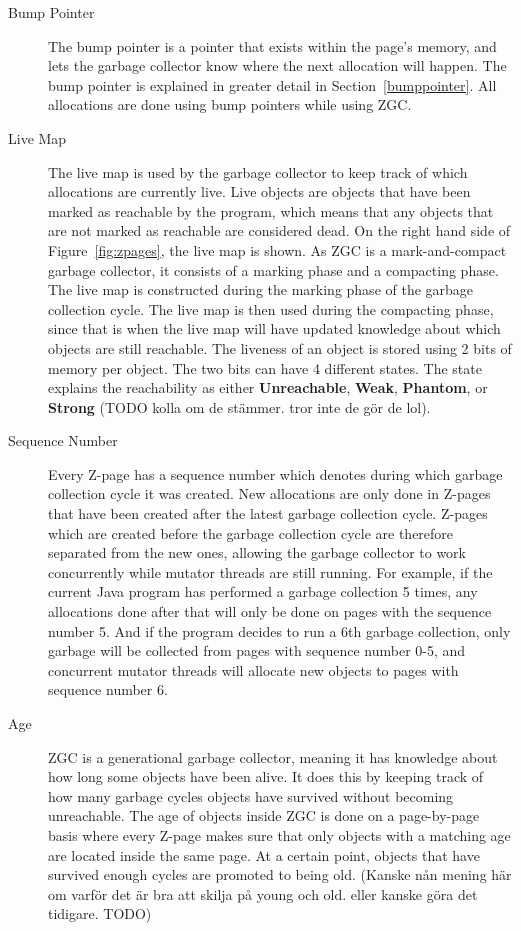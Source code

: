 \begin{description}
    \item[Bump Pointer]
        The bump pointer is a pointer that exists within the page's memory, and lets the garbage collector know where the next allocation will happen. The bump pointer is explained in greater detail in Section~\ref{bumppointer}. All allocations are done using bump pointers while using ZGC.
    \item[Live Map]
        The live map is used by the garbage collector to keep track of which allocations are currently live. Live objects are objects that have been marked as reachable by the program, which means that any objects that are not marked as reachable are considered dead. On the right hand side of Figure~\ref*{fig:zpages}, the live map is shown. As ZGC is a mark-and-compact garbage collector, it consists of a marking phase and a compacting phase. The live map is constructed during the marking phase of the garbage collection cycle. The live map is then used during the compacting phase, since that is when the live map will have updated knowledge about which objects are still reachable. The liveness of an object is stored using 2 bits of memory per object. The two bits can have 4 different states. The state explains the reachability as either \textbf{Unreachable}, \textbf{Weak}, \textbf{Phantom}, or \textbf{Strong} (TODO kolla om de stämmer. tror inte de gör de lol).
    \item[Sequence Number]
        Every Z-page has a sequence number which denotes during which garbage collection cycle it was created. New allocations are only done in Z-pages that have been created after the latest garbage collection cycle. Z-pages which are created before the garbage collection cycle are therefore separated from the new ones, allowing the garbage collector to work concurrently while mutator threads are still running. For example, if the current Java program has performed a garbage collection 5 times, any allocations done after that will only be done on pages with the sequence number 5. And if the program decides to run a 6th garbage collection, only garbage will be collected from pages with sequence number 0-5, and concurrent mutator threads will allocate new objects to pages with sequence number 6.
    \item[Age]
        ZGC is a generational garbage collector, meaning it has knowledge about how long some objects have been alive. It does this by keeping track of how many garbage cycles objects have survived without becoming unreachable. The age of objects inside ZGC is done on a page-by-page basis where every Z-page makes sure that only objects with a matching age are located inside the same page. At a certain point, objects that have survived enough cycles are promoted to being old. (Kanske nån mening här om varför det är bra att skilja på young och old. eller kanske göra det tidigare. TODO)
\end{description}

